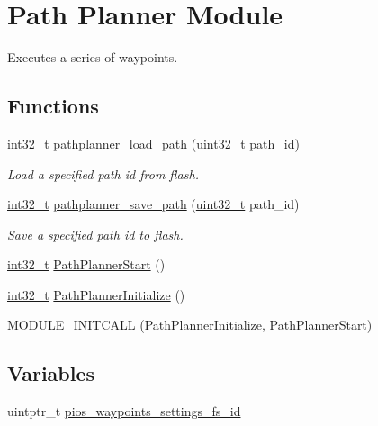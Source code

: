 \hypertarget{group___path_planner}{\section{Path Planner Module}
\label{group___path_planner}
}


Executes a series of waypoints.  


\subsection*{Functions}
\begin{DoxyCompactItemize}
\item 
\hyperlink{group___n_a_m_e_gafd12020da5a235dfcf0c3c748fb5baed}{int32\-\_\-t} \hyperlink{group___path_planner_ga2601ca435ed04ae19c977a45d56be03c}{pathplanner\-\_\-load\-\_\-path} (\hyperlink{stdint_8h_a435d1572bf3f880d55459d9805097f62}{uint32\-\_\-t} path\-\_\-id)
\begin{DoxyCompactList}\small\item\em Load a specified path id from flash. \end{DoxyCompactList}\item 
\hyperlink{group___n_a_m_e_gafd12020da5a235dfcf0c3c748fb5baed}{int32\-\_\-t} \hyperlink{group___path_planner_ga0652408cf825ce696f667d9137a2f3e4}{pathplanner\-\_\-save\-\_\-path} (\hyperlink{stdint_8h_a435d1572bf3f880d55459d9805097f62}{uint32\-\_\-t} path\-\_\-id)
\begin{DoxyCompactList}\small\item\em Save a specified path id to flash. \end{DoxyCompactList}\item 
\hyperlink{group___n_a_m_e_gafd12020da5a235dfcf0c3c748fb5baed}{int32\-\_\-t} \hyperlink{group___path_planner_gaf0d1956d741a9004d4d88cb38d43b4c4}{Path\-Planner\-Start} ()
\item 
\hyperlink{group___n_a_m_e_gafd12020da5a235dfcf0c3c748fb5baed}{int32\-\_\-t} \hyperlink{group___path_planner_ga851894b7d249ff14f2f5e1a6f294bf35}{Path\-Planner\-Initialize} ()
\item 
\hyperlink{group___path_planner_ga5614947f71f78546f4d0f379ab2bddaa}{M\-O\-D\-U\-L\-E\-\_\-\-I\-N\-I\-T\-C\-A\-L\-L} (\hyperlink{group___path_planner_ga851894b7d249ff14f2f5e1a6f294bf35}{Path\-Planner\-Initialize}, \hyperlink{group___path_planner_gaf0d1956d741a9004d4d88cb38d43b4c4}{Path\-Planner\-Start})
\end{DoxyCompactItemize}
\subsection*{Variables}
\begin{DoxyCompactItemize}
\item 
uintptr\-\_\-t \hyperlink{group___path_planner_ga4b04979e5fb31eaa66088178605835cd}{pios\-\_\-waypoints\-\_\-settings\-\_\-fs\-\_\-id}
\end{DoxyCompactItemize}


